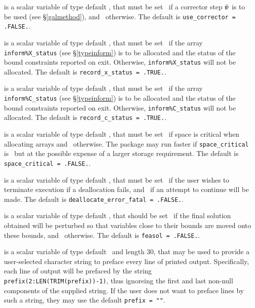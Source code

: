 \documentclass{galahad}
\begin{document}
\begin{description}
 is a scalar variable of type 
default \logical, that must be set \true\ if a corrector step $\ddot{{\bm{v}}}$
is to be used (see \S\ref{galmethod}), and \false\ otherwise. 
The default is {\tt use\_corrector = .FALSE.}.

 is a scalar variable of type 
default \logical, that must be set \true\ if the array 
{\tt inform\%X\_status} (see \S\ref{typeinform})
is to be allocated and the status of the bound 
constraints reported on exit. Otherwise, {\tt inform\%X\_status} will
not be allocated. The default is {\tt record\_x\_status = .TRUE.}.

 is a scalar variable of type 
default \logical, that must be set \true\ if the array 
{\tt inform\%C\_status} (see \S\ref{typeinform})
is to be allocated and the status of the bound 
constraints reported on exit. Otherwise, {\tt inform\%C\_status} will
not be allocated. The default is {\tt record\_c\_status = .TRUE.}.

 is a scalar variable of type default \logical, 
that must be set \true\ if space is critical when allocating arrays
and  \false\ otherwise. The package may run faster if 
{\tt space\_critical} is \false\ but at the possible expense of a larger
storage requirement. The default is {\tt space\_critical = .FALSE.}.

 is a scalar variable of type default \logical, 
that must be set \true\ if the user wishes to terminate execution if
a deallocation  fails, and \false\ if an attempt to continue
will be made. The default is {\tt deallocate\_error\_fatal = .FALSE.}.

 is a scalar variable of type default \logical, that 
should be set \true\ 
if the final solution obtained will be perturbed 
so that variables close to their bounds are moved onto these bounds,
and \false\ otherwise. 
The default is {\tt feasol = .FALSE.}.

 is a scalar variable of type default \character\
and length 30, that may be used to provide a user-selected 
character string to preface every line of printed output. 
Specifically, each line of output will be prefaced by the string 
{\tt prefix(2:LEN(TRIM(prefix))-1)},
thus ignoreing the first and last non-null components of the
supplied string. If the user does not want to preface lines by such
a string, they may use the default {\tt prefix = ""}.


\end{description}
\end{document}
